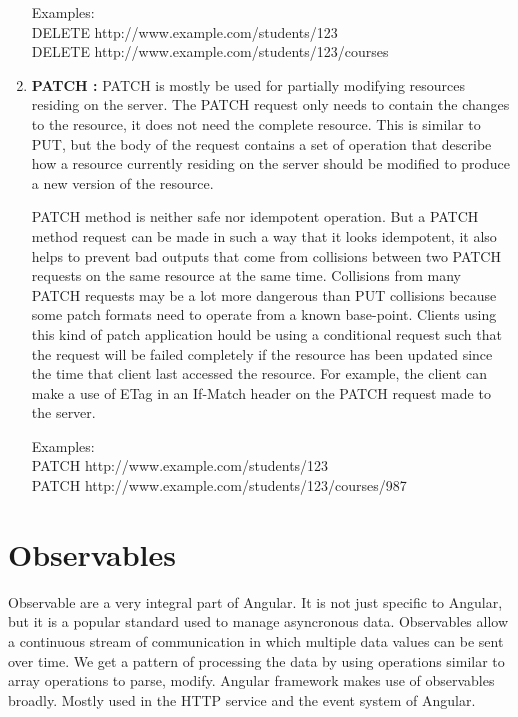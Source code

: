 \begin{enumerate}
Examples:\\
DELETE http://www.example.com/students/123\\
DELETE http://www.example.com/students/123/courses\\


\item \textbf{PATCH : } PATCH is mostly be used for partially modifying resources residing on the server. The PATCH request only needs to contain the changes to the resource, it does not need the complete resource. This is similar to PUT, but the body of the request contains a set of operation that describe how a resource currently residing on the server should be modified to produce a new version of the resource. 

\hspace*{0.2in}PATCH method is neither safe nor idempotent operation. But a PATCH method request can be made in such a way that it looks idempotent, it also helps to  prevent bad outputs that come from collisions between two PATCH requests on the same resource at the same time. Collisions from many PATCH requests may be a lot more dangerous than PUT collisions because some patch formats need to operate from a known base-point. Clients using this kind of patch application hould be using a conditional request such that the request will be failed completely if the resource has been updated since the time that client last accessed the resource. For example, the client can make a use of ETag in an If-Match header on the PATCH request made to the server.

Examples:\\
PATCH http://www.example.com/students/123\\
PATCH http://www.example.com/students/123/courses/987\\

\end{enumerate}

\section{Observables}

\hspace*{0.2in}Observable are a very integral part of Angular. It  is not just specific to  Angular, but it is a popular standard used to manage asyncronous data. Observables allow a continuous stream of communication in which multiple data values can be sent over time. We get a pattern of processing the data by using operations similar to array operations to parse, modify. Angular framework makes use of observables broadly. Mostly used in the HTTP service and the event system of Angular.
	
